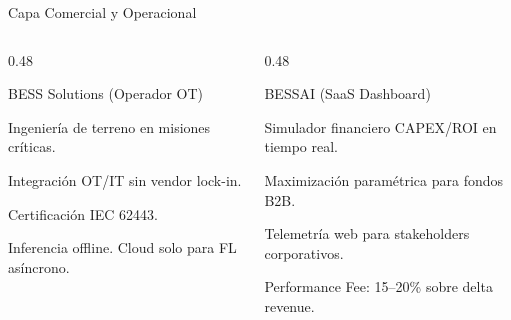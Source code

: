 \documentclass[10pt,aspectratio=169]{beamer}
\let\tempone\itemize
\let\temptwo\enditemize
\renewenvironment{itemize}{\tempone\addtolength{\itemsep}{0.3em}}{\temptwo}
\begin{document}
\begin{frame}{Capa Comercial y Operacional}
  \begin{columns}[T]
    \begin{column}{0.48\textwidth}
      \begin{block}{BESS Solutions (Operador OT)}
        \begin{itemize}\footnotesize
          \item Ingenier\'ia de terreno en misiones cr\'iticas.
          \item Integraci\'on OT/IT sin vendor lock-in.
          \item Certificaci\'on IEC 62443.
          \item Inferencia offline. Cloud solo para FL as\'incrono.
        \end{itemize}
      \end{block}
    \end{column}
    \begin{column}{0.48\textwidth}
      \begin{block}{BESSAI (SaaS Dashboard)}
        \begin{itemize}\footnotesize
          \item Simulador financiero CAPEX/ROI en tiempo real.
          \item Maximizaci\'on param\'etrica para fondos B2B.
          \item Telemetr\'ia web para stakeholders corporativos.
          \item Performance Fee: 15--20\% sobre delta revenue.
        \end{itemize}
      \end{block}
    \end{column}
  \end{columns}
\end{frame}
\end{document}
